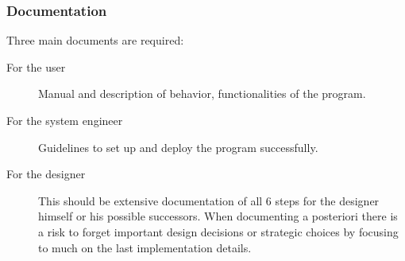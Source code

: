 \subsubsection{Documentation}
Three main  documents are required:
\begin{description}
	\item[For the user] Manual and description of behavior, functionalities of the program.
	\item[For the system engineer] Guidelines to set up and deploy the program successfully. 
	\item[For the designer] This should be extensive documentation of all 6 steps for the designer himself or his possible successors. When documenting a posteriori there is a risk to forget important design decisions or strategic choices by focusing to much on the last implementation details. 
\end{description}

